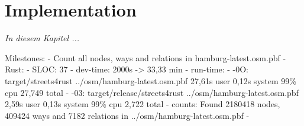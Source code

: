 \chapter{Implementation}
\label{chap:Implementation}

\textit{%
In diesem Kapitel ...
}
\bigskip


Milestones:
    - Count all nodes, ways and relations in hamburg-latest.osm.pbf
        - Rust:
            - SLOC: 37
            - dev-time: 2000s -> 33,33 min
            - run-time:
                - -0O: target/streets4rust ../osm/hamburg-latest.osm.pbf  27,61s user 0,12s system 99\% cpu 27,749 total
                - -03: target/release/streets4rust ../osm/hamburg-latest.osm.pbf  2,59s user 0,13s system 99\% cpu 2,722 total
            - counts: Found 2180418 nodes, 409424 ways and 7182 relations in ../osm/hamburg-latest.osm.pbf
        - 
